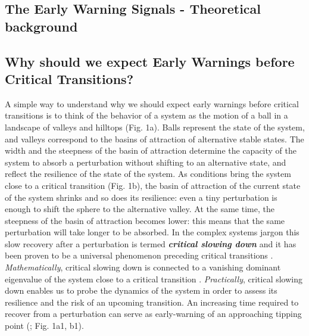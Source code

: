 \documentclass[12pt,a4paper,final]{article}
\begin{document}
\begin{doublespacing}

\section{The Early Warning Signals - Theoretical background} 

\subsection{Why should we expect Early Warnings before Critical Transitions?}
A simple way to understand why we should expect early warnings before critical transitions is to think of the behavior of a system as the motion of a ball in a landscape of valleys and hilltops (Fig. 1a). Balls represent the state of the system, and valleys correspond to the basins of attraction of alternative stable states. The width and the steepness of the basin of attraction determine the capacity of the system to absorb a perturbation without shifting to an alternative state, and reflect the resilience of the state of the system. As conditions bring the system close to a critical transition (Fig. 1b), the basin of attraction of the current state of the system shrinks and so does its resilience: even a tiny perturbation is enough to shift the sphere to the alternative valley. At the same time, the steepness of the basin of attraction becomes lower: this means that the same perturbation will take longer to be absorbed. In the complex systems jargon this slow recovery after a perturbation is termed \textit{\textbf{critical slowing down}} \cite{Wissel1984,Strogatz1994} and it has been proven to be a universal phenomenon preceding critical transitions \cite{Kuehn2011a}. \textit{Mathematically}, critical slowing down is connected to a vanishing dominant eigenvalue of the system close to a critical transition \cite{Strogatz1994}. \textit{Practically}, critical slowing down enables us to probe the dynamics of the system in order to assess its resilience and the risk of an upcoming transition. An increasing time required to recover from a perturbation can serve as early-warning of an approaching tipping point (\cite{VanNes2007}; Fig. 1a1, b1).


\end{doublespacing}
\end{document}
